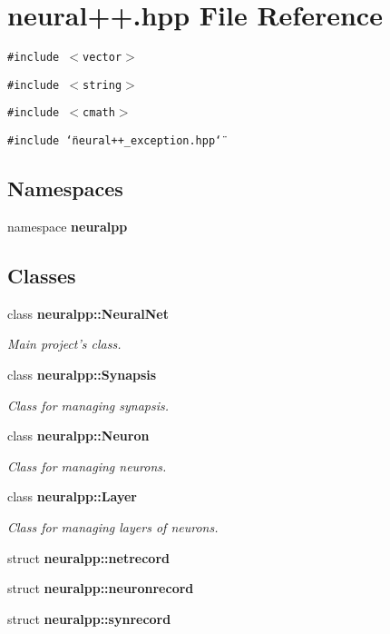 \section{neural++.hpp File Reference}
\label{neural_09_09_8hpp}
{\tt \#include $<$vector$>$}\par
{\tt \#include $<$string$>$}\par
{\tt \#include $<$cmath$>$}\par
{\tt \#include \char`\"{}neural++\_\-exception.hpp\char`\"{}}\par
\subsection*{Namespaces}
\begin{CompactItemize}
\item 
namespace {\bf neuralpp}
\end{CompactItemize}
\subsection*{Classes}
\begin{CompactItemize}
\item 
class {\bf neuralpp::NeuralNet}
\begin{CompactList}\small\item\em Main project's class. \item\end{CompactList}\item 
class {\bf neuralpp::Synapsis}
\begin{CompactList}\small\item\em Class for managing synapsis. \item\end{CompactList}\item 
class {\bf neuralpp::Neuron}
\begin{CompactList}\small\item\em Class for managing neurons. \item\end{CompactList}\item 
class {\bf neuralpp::Layer}
\begin{CompactList}\small\item\em Class for managing layers of neurons. \item\end{CompactList}\item 
struct {\bf neuralpp::netrecord}
\item 
struct {\bf neuralpp::neuronrecord}
\item 
struct {\bf neuralpp::synrecord}
\end{CompactItemize}
